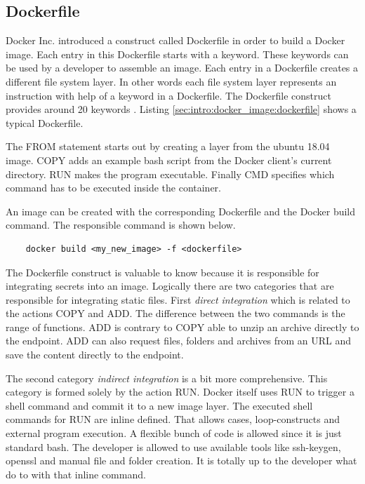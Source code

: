 \subsection{Dockerfile}
\label{sec:intro:docker_image:docker_img:dockerfile}
Docker Inc. introduced a construct called Dockerfile in order to build a Docker image.
Each entry in this Dockerfile starts with a keyword. 
These keywords can be used by a developer to assemble an image. 
Each entry in a Dockerfile creates a different file system layer. 
In other words each file system layer represents an instruction with help of a keyword in a Dockerfile.
The Dockerfile construct provides around 20 keywords \cite{dockerfile_ref}.
Listing \ref{sec:intro:docker_image:dockerfile} shows a typical Dockerfile.

The FROM statement starts out by creating a layer from the ubuntu 18.04 image. 
COPY adds an example bash script from the Docker client’s current directory. 
RUN makes the program executable. 
Finally CMD specifies which command has to be executed inside the container.

An image can be created with the corresponding Dockerfile and the Docker build command. The responsible command is shown below.
\begin{lstlisting}
	docker build <my_new_image> -f <dockerfile>
\end{lstlisting}
The Dockerfile construct is valuable to know because it is responsible for integrating secrets into an image. 
Logically there are two categories that are responsible for integrating static files.
First \textit{direct integration} which is related to the actions COPY and ADD. 
The difference between the two commands is the range of functions. 
ADD is contrary to COPY able to unzip an archive directly to the endpoint.
ADD can also request files, folders and archives from an URL and save the content directly to the endpoint.

The second category \textit{indirect integration} is a bit more comprehensive. 
This category is formed solely by the action RUN.
Docker itself uses RUN to trigger a shell command and commit it to a new image layer.
The executed shell commands for RUN are inline defined. That allows cases, loop-constructs and external program execution. 
A flexible bunch of code is allowed since it is just standard bash. 
The developer is allowed to use available tools like ssh-keygen, openssl and manual file and folder creation.
It is totally up to the developer what do to with that inline command. 

